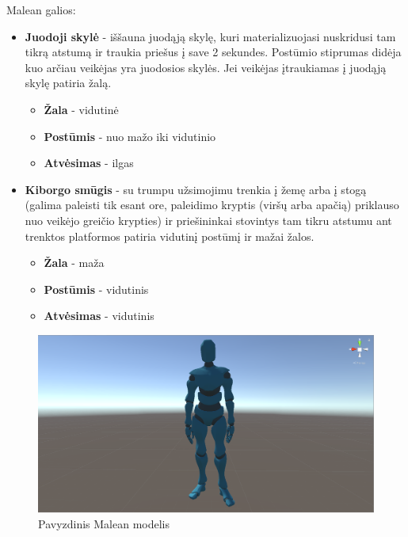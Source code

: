 \documentclass{VUMIFPSkursinis}
\begin{document}
Malean galios:
\begin{itemize}
    \item \textbf{Juodoji skylė} - iššauna juodąją skylę, kuri materializuojasi nuskridusi tam tikrą atstumą ir traukia priešus į save 2 sekundes. Postūmio stiprumas didėja kuo arčiau veikėjas yra juodosios skylės. Jei veikėjas įtraukiamas į juodąją skylę patiria žalą.
    \begin{itemize}
        \item \textbf{Žala} - vidutinė
        \item \textbf{Postūmis} - nuo mažo iki vidutinio
        \item \textbf{Atvėsimas} - ilgas
    \end{itemize}
    \item \textbf{Kiborgo smūgis} - su trumpu užsimojimu trenkia į žemę arba į stogą (galima paleisti tik esant ore, paleidimo kryptis (viršų arba apačią) priklauso nuo veikėjo greičio krypties) ir priešininkai stovintys tam tikru atstumu ant trenktos platformos patiria vidutinį postūmį ir mažai žalos.
    \begin{itemize}
        \item \textbf{Žala} - maža
        \item \textbf{Postūmis} - vidutinis
        \item \textbf{Atvėsimas} - vidutinis
    \end{itemize}
\end{itemize}

\begin{figure}[H]
    \centering
    \includegraphics[scale=0.3]{img/Characters/Malean.png}
    \caption{Pavyzdinis Malean modelis}
    \label{img:malean}
\end{figure}

\end{document}
